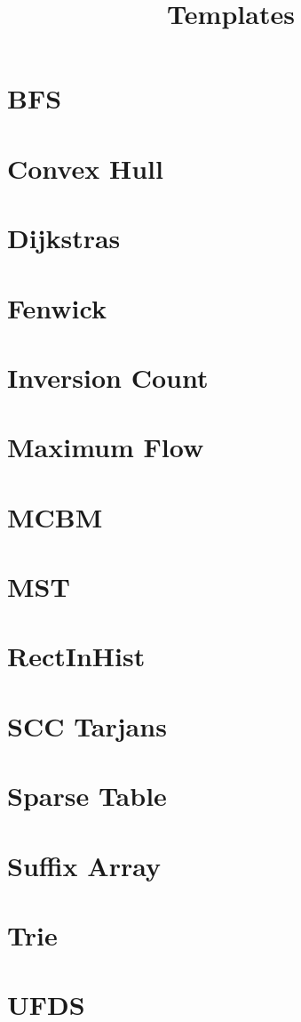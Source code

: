 \documentclass[]{article}
\begin{document}
    \title{Templates}
    {\tiny
    \section{BFS}
    
    \section{Convex Hull}
    
    \section{Dijkstras}
    
    \section{Fenwick}
    
    \section{Inversion Count}
    
    \section{Maximum Flow}
    
    \section{MCBM}
    
    \section{MST}
    
    \section{RectInHist}
    
    \section{SCC Tarjans}
    
    \section{Sparse Table}
    
    \section{Suffix Array}
    
    \section{Trie}
    
    \section{UFDS}
    
  }
\end{document}
